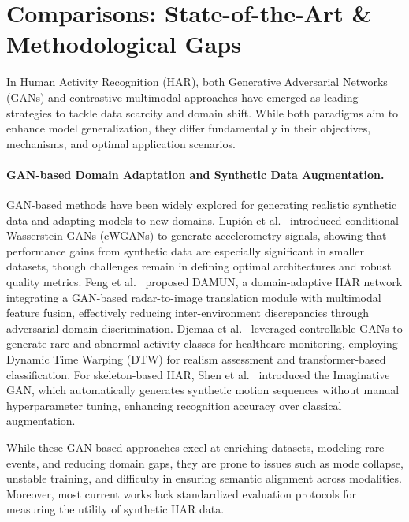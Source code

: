\section{Comparisons: State-of-the-Art \& Methodological Gaps}

In Human Activity Recognition (HAR), both Generative Adversarial Networks (GANs) and contrastive multimodal approaches have emerged as leading strategies to tackle data scarcity and domain shift. While both paradigms aim to enhance model generalization, they differ fundamentally in their objectives, mechanisms, and optimal application scenarios.

\paragraph{GAN-based Domain Adaptation and Synthetic Data Augmentation.}
GAN-based methods have been widely explored for generating realistic synthetic data and adapting models to new domains. Lupión et al.~\cite{lupion2024data} introduced conditional Wasserstein GANs (cWGANs) to generate accelerometry signals, showing that performance gains from synthetic data are especially significant in smaller datasets, though challenges remain in defining optimal architectures and robust quality metrics. Feng et al.~\cite{feng2023damun} proposed DAMUN, a domain-adaptive HAR network integrating a GAN-based radar-to-image translation module with multimodal feature fusion, effectively reducing inter-environment discrepancies through adversarial domain discrimination. Djemaa et al.~\cite{djemaa2024improved} leveraged controllable GANs to generate rare and abnormal activity classes for healthcare monitoring, employing Dynamic Time Warping (DTW) for realism assessment and transformer-based classification. For skeleton-based HAR, Shen et al.~\cite{shen2021imaginative} introduced the Imaginative GAN, which automatically generates synthetic motion sequences without manual hyperparameter tuning, enhancing recognition accuracy over classical augmentation.

While these GAN-based approaches excel at enriching datasets, modeling rare events, and reducing domain gaps, they are prone to issues such as mode collapse, unstable training, and difficulty in ensuring semantic alignment across modalities. Moreover, most current works lack standardized evaluation protocols for measuring the utility of synthetic HAR data.

